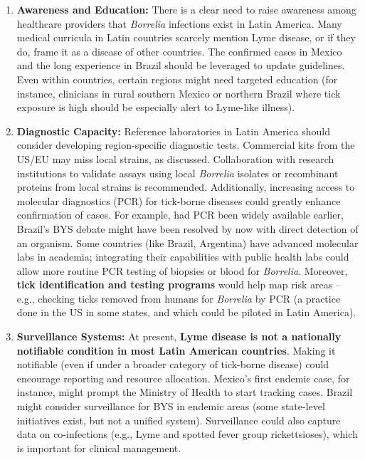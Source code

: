 \documentclass[11pt,letterpaper]{article}
\begin{document}
\begin{enumerate}
    \item \textbf{Awareness and Education:} There is a clear need to raise awareness among healthcare providers that \textit{Borrelia} infections exist in Latin America. Many medical curricula in Latin countries scarcely mention Lyme disease, or if they do, frame it as a disease of other countries. The confirmed cases in Mexico and the long experience in Brazil should be leveraged to update guidelines. Even within countries, certain regions might need targeted education (for instance, clinicians in rural southern Mexico or northern Brazil where tick exposure is high should be especially alert to Lyme-like illness).

    \item \textbf{Diagnostic Capacity:} Reference laboratories in Latin America should consider developing region-specific diagnostic tests. Commercial kits from the US/EU may miss local strains, as discussed. Collaboration with research institutions to validate assays using local \textit{Borrelia} isolates or recombinant proteins from local strains is recommended. Additionally, increasing access to molecular diagnostics (PCR) for tick-borne diseases could greatly enhance confirmation of cases. For example, had PCR been widely available earlier, Brazil's BYS debate might have been resolved by now with direct detection of an organism. Some countries (like Brazil, Argentina) have advanced molecular labs in academia; integrating their capabilities with public health labs could allow more routine PCR testing of biopsies or blood for \textit{Borrelia}. Moreover, \textbf{tick identification and testing programs} would help map risk areas – e.g., checking ticks removed from humans for \textit{Borrelia} by PCR (a practice done in the US in some states, and which could be piloted in Latin America).

    \item \textbf{Surveillance Systems:} At present, \textbf{Lyme disease is not a nationally notifiable condition in most Latin American countries}. Making it notifiable (even if under a broader category of tick-borne disease) could encourage reporting and resource allocation. Mexico's first endemic case, for instance, might prompt the Ministry of Health to start tracking cases. Brazil might consider surveillance for BYS in endemic areas (some state-level initiatives exist, but not a unified system). Surveillance could also capture data on co-infections (e.g., Lyme and spotted fever group rickettsioses), which is important for clinical management.


\end{enumerate}
\end{document}
